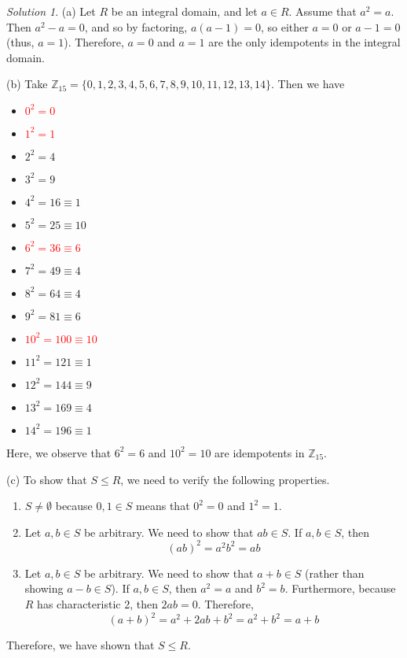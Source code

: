 \documentclass[11pt]{amsart}
\theoremstyle{definition}\newtheorem{question}{Question}
\theoremstyle{definition}\newtheorem{claim}{Claim}
\theoremstyle{remark}\newtheorem*{solution}{Solution}
\newcommand{\Z}{\mathbb{Z}}
\begin{document}
\begin{solution}
    (a) Let $R$ be an integral domain, and let $a \in R$. Assume that $a^2 = a$. Then $a^2 - a = 0$, and so by factoring, $a(a - 1) = 0$, so either $a = 0$ or $a - 1 = 0$ (thus, $a = 1$). Therefore, $a = 0$ and $a = 1$ are the only idempotents in the integral domain.

    (b) Take $\Z_{15} = \{0, 1, 2, 3, 4, 5, 6, 7, 8, 9, 10, 11, 12, 13, 14\}$. Then we have
    \begin{multicols}{3}
        \begin{itemize}
            \item \textcolor{red}{$0^2 = 0$}
            \item \textcolor{red}{$1^2 = 1$}
            \item $2^2 = 4$
            \item $3^2 = 9$
            \item $4^2 = 16 \equiv 1$
            \item $5^2 = 25 \equiv 10$
            \item \textcolor{red}{$6^2 = 36 \equiv 6$}
            \item $7^2 = 49 \equiv 4$
            \item $8^2 = 64 \equiv 4$
            \item $9^2 = 81 \equiv 6$
            \item \textcolor{red}{$10^2 = 100 \equiv 10$}
            \item $11^2 = 121 \equiv 1$
            \item $12^2 = 144 \equiv 9$
            \item $13^2 = 169 \equiv 4$
            \item $14^2 = 196 \equiv 1$
        \end{itemize}
    \end{multicols}
    Here, we observe that $6^2 = 6$ and $10^2 = 10$ are idempotents in $\Z_{15}$.

    (c) To show that $S \leq R$, we need to verify the following properties.
    \begin{enumerate}
        \item $S \neq \emptyset$ because $0, 1 \in S$ means that $0^2 = 0$ and $1^2 = 1$.
        \item Let $a, b \in S$ be arbitrary. We need to show that $ab \in S$. If $a, b \in S$, then
        \begin{equation*}
            (ab)^2 = a^2b^2 = ab
        \end{equation*}
        \item Let $a, b \in S$ be arbitrary. We need to show that $a + b \in S$ (rather than showing $a - b \in S$). If $a, b \in S$, then $a^2 = a$ and $b^2 = b$. Furthermore, because $R$ has characteristic 2, then $2ab = 0$. Therefore,
        \begin{equation*}
            (a + b)^2 = a^2 + 2ab + b^2 = a^2 + b^2 = a + b
        \end{equation*}
    \end{enumerate}
    Therefore, we have shown that $S \leq R$.
\end{solution}
\end{document}
